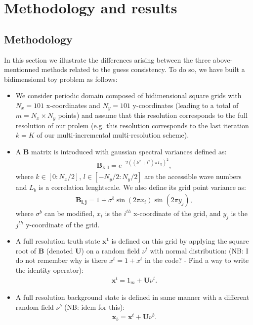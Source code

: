 \documentclass[npg, manuscript]{copernicus}
\begin{document}
\section{Methodology and results}

\subsection{Methodology}
In this section we illustrate the differences arising between the three above-mentionned methods related to the guess consistency. To do so, we have built a bidimensional toy problem as follows:
\begin{itemize}
 \item We consider periodic domain composed of bidimensional square grids with $N_x=101$ x-coordinates and $N_y=101$ y-coordinates (leading to a total of $m = N_x \times N_y$ points) and assume that this resolution corresponds to the full resolution of our prolem (e.g. this resolution corresponds to the last iteration $k=K$ of our multi-incremental multi-resolution scheme).
 \item A $\mathbf{B}$ matrix is introduced with gaussian spectral variances defined as:
 \begin{align}
  \mathbf{B_{k,l}} = e^{-2((k^2 + l^2)\pi L_b)^2}, 
 \end{align}
 where $k \in [0:N_x/2]$, $l \in [-N_y/2:N_y/2]$ are the accessible wave numbers and $L_b$ is a correlation lenghtscale.
 We also define its grid point variance as:
 \begin{align}
 \mathbf{B_{i,j}} = 1 + \sigma^b \sin(2\pi x_i) \sin(2\pi y_j),  
 \end{align}
where $\sigma^b$ can be modified, $x_i$ is the $i^{th}$ x-coordinate of the grid, and $y_j$ is the $j^{th}$ y-coordinate of the grid.
 \item A full resolution truth state $\mathbf{x^t}$ is defined on this grid by applying the square root of $\mathbf{B}$ (denoted $\mathbf{U}$) on a random field $\nu^{t}$ with normal distribution: (NB: I do not remember why is there $x^t = 1+x^t$ in the code? - Find a way to write the identity operator):
 \begin{align}
 \mathbf{x}^t = 1_m + \mathbf{U}\nu^{t}.
 \end{align}
 \item A full resolution background state is defined in same manner with a different random field $\nu^{b}$ (NB: idem for this):
 \begin{align}
 \mathbf{x}_b=\mathbf{x}^t + \mathbf{U}\nu^{b}.

\end{align}
\end{itemize}
\end{document}
